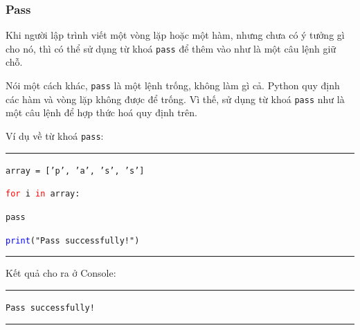 \subsubsection{Pass}
Khi người lập trình viết một vòng lặp hoặc một hàm, nhưng chưa có ý tưởng gì cho nó, thì có thể sử dụng từ khoá \texttt{pass} để thêm vào như là một câu lệnh giữ chỗ.\par
Nói một cách khác, \texttt{pass} là một lệnh trống, không làm gì cả. Python quy định các hàm và vòng lặp không được để trống. Vì thế, sử dụng từ khoá \texttt{pass} như là một câu lệnh để hợp thức hoá quy định trên.\par
Ví dụ về từ khoá \texttt{pass}:\\
\rule{\linewidth}{0.2mm}\par
\begin{linenumbers}
	\texttt{array = ['p', 'a', 's', 's']}\par
	\texttt{\textcolor{red}{for} i \textcolor{red}{in} array:}\par
	\qquad\texttt{pass}\par
	\texttt{\textcolor{blue}{print}("Pass successfully!")}\par
\end{linenumbers}
\rule{\linewidth}{0.2mm}\par
\noindent
\resetlinenumber
Kết quả cho ra ở Console:\\
\rule{\linewidth}{0.2mm}\par
\begin{linenumbers}
	\texttt{Pass successfully!}
\end{linenumbers}
\rule{\linewidth}{0.2mm}\par
\resetlinenumber
\newpage